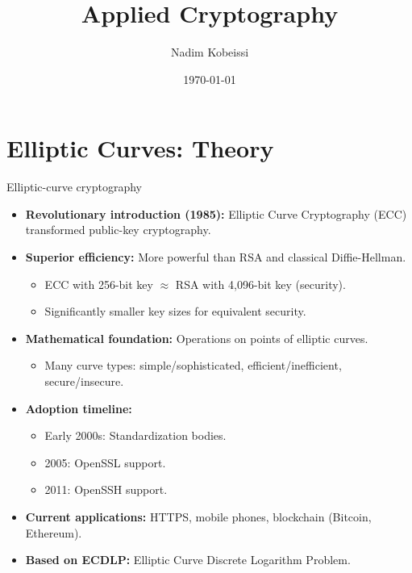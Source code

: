 \documentclass[aspectratio=169, lualatex, handout]{beamer}
\title{Applied Cryptography}
\author{Nadim Kobeissi}
\institute{American University of Beirut}
\date{\today}
\begin{document}
\begin{frame}[plain]
	\titlepage
\end{frame}

\section{Elliptic Curves: Theory}

\begin{frame}{Elliptic-curve cryptography}
	\begin{itemize}[<+->]
		\item \textbf{Revolutionary introduction (1985):} Elliptic Curve Cryptography (ECC) transformed public-key cryptography.
		\item \textbf{Superior efficiency:} More powerful than RSA and classical Diffie-Hellman.
		      \begin{itemize}
			      \item ECC with 256-bit key $\approx$ RSA with 4,096-bit key (security).
			      \item Significantly smaller key sizes for equivalent security.
		      \end{itemize}
		\item \textbf{Mathematical foundation:} Operations on points of elliptic curves.
		      \begin{itemize}
			      \item Many curve types: simple/sophisticated, efficient/inefficient, secure/insecure.
		      \end{itemize}
		\item \textbf{Adoption timeline:}
		      \begin{itemize}
			      \item Early 2000s: Standardization bodies.
			      \item 2005: OpenSSL support.
			      \item 2011: OpenSSH support.
		      \end{itemize}
		\item \textbf{Current applications:} HTTPS, mobile phones, blockchain (Bitcoin, Ethereum).
		\item \textbf{Based on ECDLP:} Elliptic Curve Discrete Logarithm Problem.
	\end{itemize}
\end{frame}
\end{document}

